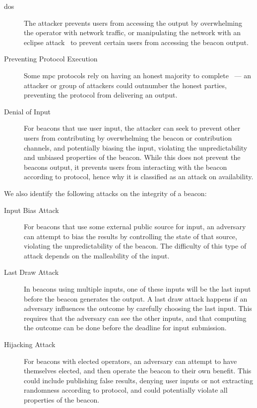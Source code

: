 \begin{description}
    \item[\Acrfull{dos}] The attacker prevents users from accessing the output by overwhelming the operator with network traffic, or manipulating the network with an eclipse attack~\cite{Singh06eclipseattacks} to prevent certain users from accessing the beacon output.
    \item[Preventing Protocol Execution] Some \gls{mpc} protocols rely on having an honest majority to complete~\cite{cascudo2017scrape} --- an attacker or group of attackers could outnumber the honest parties, preventing the protocol from delivering an output.
    \item[Denial of Input] For beacons that use user input, the attacker can seek to prevent other users from contributing by overwhelming the beacon or contribution channels, and potentially biasing the input, violating the unpredictability and unbiased properties of the beacon.
        While this does not prevent the beacons output, it prevents users from interacting with the beacon according to protocol, hence why it is classified as an attack on availability.
\end{description}

\noindent%
We also identify the following attacks on the integrity of a beacon:

\begin{description}
    \item[Input Bias Attack] For beacons that use some external public source for input, an adversary can attempt to bias the results by controlling the state of that source, violating the unpredictability of the beacon.
        The difficulty of this type of attack depends on the malleability of the input.
    \item[Last Draw Attack] In beacons using multiple inputs, one of these inputs will be the last input before the beacon generates the output.
        A last draw attack happens if an adversary influences the outcome by carefully choosing the last input.
        This requires that the adversary can see the other inputs, and that computing the outcome can be done before the deadline for input submission.
    \item[Hijacking Attack] For beacons with elected operators, an adversary can attempt to have themselves elected, and then operate the beacon to their own benefit.
        This could include publishing false results, denying user inputs or not extracting randomness according to protocol, and could potentially violate all properties of the beacon. %

\end{description}
